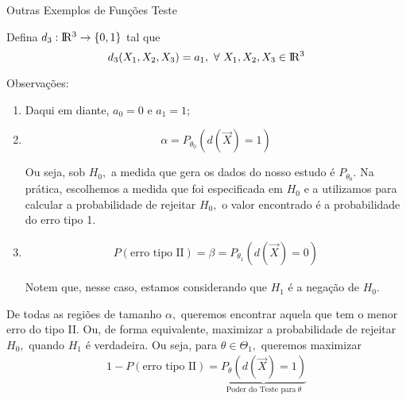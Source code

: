 \documentclass[12pt]{beamer}
\begin{document}
\begin{frame}{Outras Exemplos de Funções Teste}
\begin{block}{}
\justifying
    Defina $d_{3}:\rm I\!R^{3}\rightarrow \{0,1\}$ tal que 
    \[
d_{3}(X_{1},X_{2},X_{3}) = a_{1},~\forall ~X_{1},X_{2},X_{3}\in \rm I\!R^{3}
\]
\end{block}
\end{frame}

\begin{frame}{}
\begin{block}{Observações:}
\justifying
\begin{enumerate}
\item Daqui em diante, $a_{0}=0$ e $a_{1}=1;$
\pause
    \item $$\alpha=P_{\theta_{0}}(d(\vec{X})=1)$$
\pause
\begin{block}{}
Ou seja, sob $H_{0},$ a medida que gera os dados do nosso estudo é $P_{\theta_{0}}.$ Na prática, escolhemos a medida que foi especificada em $H_{0}$ e a utilizamos para calcular a probabilidade de rejeitar $H_{0},$ o valor encontrado é a probabilidade do erro tipo 1.    
\end{block}
\pause
\item \begin{align*}
    P(\text{erro tipo II})=\beta=P_{\theta_{1}}(d(\vec{X})=0)
\end{align*}
\pause
\vspace{-0.5cm}
\begin{block}{}
\justifying
Notem que, nesse caso, estamos considerando que $H_{1}$ é a negação de $H_{0}.$
\end{block}
\end{enumerate}
\end{block}
\end{frame}

\begin{frame}{}
\begin{block}{}
\justifying
De todas as regiões de tamanho $\alpha,$ queremos encontrar aquela que tem o menor erro do tipo II. Ou, de forma equivalente, maximizar a probabilidade de rejeitar $H_{0},$ quando $H_{1}$ é verdadeira. Ou seja, para $\theta\in\Theta_{1},$ queremos maximizar 
\begin{align*}
    1-P(\text{erro tipo II})=\underbrace{P_{\theta}(d(\vec{X})=1)}_{\text{Poder do Teste para}~\theta}
\end{align*}
\end{block}
\end{frame}
\end{document}
